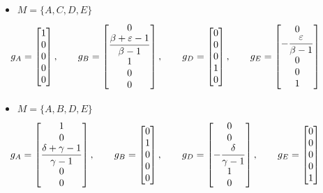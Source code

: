 \begin{itemize}
    \item $M = \{A,C,D,E\}$
    \[\hspace*{-4em}\renewcommand*{\arraystretch}{1}\everymath{\displaystyle}
    g_A = \left[\begin{matrix}1\\0\\0\\0\\0\end{matrix}\right], \hspace*{2em}
    g_B =\left[\begin{matrix}0\\\frac{\beta + \varepsilon - 1}{\beta - 1}\\1\\0\\0\end{matrix}\right], \hspace*{2em}
    g_D = \left[\begin{matrix}0\\0\\0\\1\\0\end{matrix}\right], \hspace*{2em}
    g_E = \left[\begin{matrix}0\\- \frac{\varepsilon}{\beta - 1}\\0\\0\\1\end{matrix}\right]
      \]

    \item $M = \{A,B,D,E\}$
    \[\hspace*{-4em}\renewcommand*{\arraystretch}{1}\everymath{\displaystyle}
    g_A = \left[\begin{matrix}1\\0\\\frac{\delta + \gamma - 1}{\gamma - 1}\\0\\0\end{matrix}\right], \hspace*{2em}
    g_B = \left[\begin{matrix}0\\1\\0\\0\\0\end{matrix}\right], \hspace*{2em}
    g_D = \left[\begin{matrix}0\\0\\- \frac{\delta}{\gamma - 1}\\1\\0\end{matrix}\right], \hspace*{2em}
    g_E = \left[\begin{matrix}0\\0\\0\\0\\1\end{matrix}\right] \]


\end{itemize}
